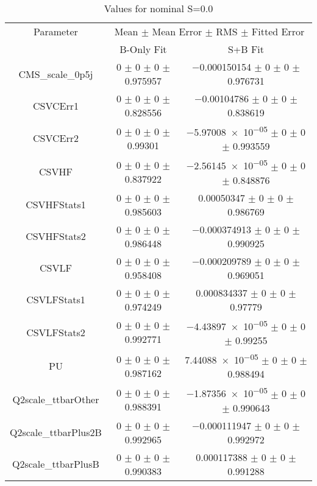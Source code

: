 \begin{table}
\centering
\caption{Values for nominal S=0.0}
\begin{tabular}{ccc}
\toprule
Parameter & \multicolumn{2}{c}{Mean $\pm$ Mean Error $\pm$ RMS $\pm$ Fitted Error}\\
 & B-Only Fit & S+B Fit\\
\midrule
CMS\_scale\_0p5j & \num{0} $\pm$ \num{0} $\pm$ \num{0} $\pm$ \num{0.975957} & \num{-0.000150154} $\pm$ \num{0} $\pm$ \num{0} $\pm$ \num{0.976731}\\
CSVCErr1 & \num{0} $\pm$ \num{0} $\pm$ \num{0} $\pm$ \num{0.828556} & \num{-0.00104786} $\pm$ \num{0} $\pm$ \num{0} $\pm$ \num{0.838619}\\
CSVCErr2 & \num{0} $\pm$ \num{0} $\pm$ \num{0} $\pm$ \num{0.99301} & \num{-5.97008e-05} $\pm$ \num{0} $\pm$ \num{0} $\pm$ \num{0.993559}\\
CSVHF & \num{0} $\pm$ \num{0} $\pm$ \num{0} $\pm$ \num{0.837922} & \num{-2.56145e-05} $\pm$ \num{0} $\pm$ \num{0} $\pm$ \num{0.848876}\\
CSVHFStats1 & \num{0} $\pm$ \num{0} $\pm$ \num{0} $\pm$ \num{0.985603} & \num{0.00050347} $\pm$ \num{0} $\pm$ \num{0} $\pm$ \num{0.986769}\\
CSVHFStats2 & \num{0} $\pm$ \num{0} $\pm$ \num{0} $\pm$ \num{0.986448} & \num{-0.000374913} $\pm$ \num{0} $\pm$ \num{0} $\pm$ \num{0.990925}\\
CSVLF & \num{0} $\pm$ \num{0} $\pm$ \num{0} $\pm$ \num{0.958408} & \num{-0.000209789} $\pm$ \num{0} $\pm$ \num{0} $\pm$ \num{0.969051}\\
CSVLFStats1 & \num{0} $\pm$ \num{0} $\pm$ \num{0} $\pm$ \num{0.974249} & \num{0.000834337} $\pm$ \num{0} $\pm$ \num{0} $\pm$ \num{0.97779}\\
CSVLFStats2 & \num{0} $\pm$ \num{0} $\pm$ \num{0} $\pm$ \num{0.992771} & \num{-4.43897e-05} $\pm$ \num{0} $\pm$ \num{0} $\pm$ \num{0.99255}\\
PU & \num{0} $\pm$ \num{0} $\pm$ \num{0} $\pm$ \num{0.987162} & \num{7.44088e-05} $\pm$ \num{0} $\pm$ \num{0} $\pm$ \num{0.988494}\\
Q2scale\_ttbarOther & \num{0} $\pm$ \num{0} $\pm$ \num{0} $\pm$ \num{0.988391} & \num{-1.87356e-05} $\pm$ \num{0} $\pm$ \num{0} $\pm$ \num{0.990643}\\
Q2scale\_ttbarPlus2B & \num{0} $\pm$ \num{0} $\pm$ \num{0} $\pm$ \num{0.992965} & \num{-0.000111947} $\pm$ \num{0} $\pm$ \num{0} $\pm$ \num{0.992972}\\
Q2scale\_ttbarPlusB & \num{0} $\pm$ \num{0} $\pm$ \num{0} $\pm$ \num{0.990383} & \num{0.000117388} $\pm$ \num{0} $\pm$ \num{0} $\pm$ \num{0.991288}\\

\end{tabular}
\end{table}

